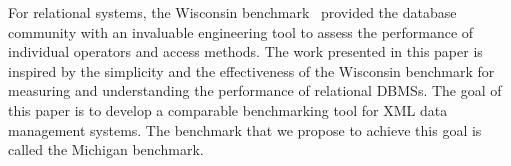 For relational systems, the
Wisconsin benchmark~\cite{wiss} provided the database community
with an invaluable engineering tool to assess the performance of
individual operators and access methods. The work presented in this 
paper is inspired by the simplicity and the effectiveness of the 
Wisconsin benchmark for measuring and understanding the performance 
of relational DBMSs. The goal of this paper is to 
develop a comparable benchmarking tool for XML data management systems. 
The benchmark that we propose to achieve this goal is called the 
Michigan benchmark. 
